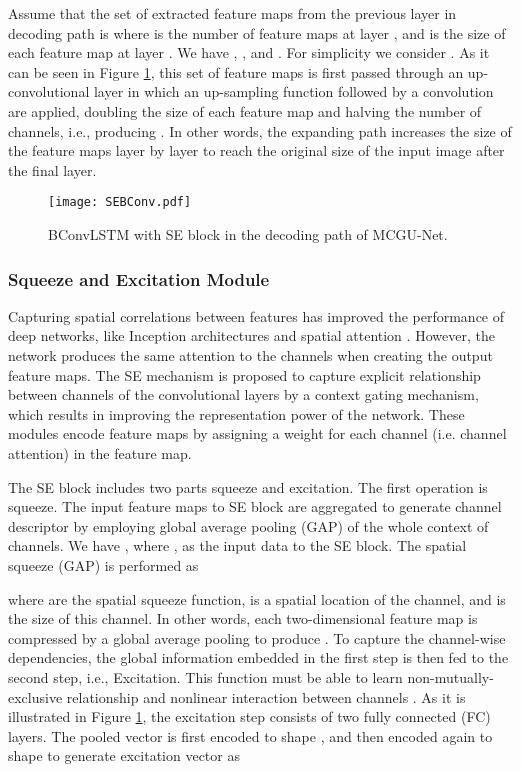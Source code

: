 \documentclass[journal]{IEEEtran}
\begin{document}
Assume that the set of extracted feature maps from the previous layer in decoding path is  where  is the number of feature maps at layer , and  is the size of each feature map at layer . We have , , and . For simplicity we consider . As it can be seen in Figure \ref{fig:BConvLSTM}, this set of feature maps is first passed through an up-convolutional layer in which an up-sampling function followed by a  convolution are applied, doubling the size of each feature map and halving the number of channels, i.e., producing  . In other words, the expanding path increases the size of the feature maps layer by layer to reach the original size of the input image after the final layer.





\begin{figure}
\centering
\texttt{[image: SEBConv.pdf]}
\caption{BConvLSTM with SE block in the decoding path of MCGU-Net.} \label{fig:BConvLSTM}
\vspace*{-\baselineskip}
\end{figure}


\subsubsection{Squeeze and Excitation Module}
Capturing spatial correlations between features has improved the performance of deep networks, like Inception architectures \cite{szegedy2015going} and spatial attention \cite{jaderberg2015spatial}. 
However, the network produces the same attention to the channels when creating the output feature maps.
The SE mechanism \cite{hu2018squeeze} is proposed to capture explicit relationship between channels of the convolutional layers by a context gating mechanism, which results in improving the representation power of the network. These modules encode feature maps by assigning a weight for each channel (i.e. channel attention) in the feature map. 


The SE block includes two parts squeeze and excitation. The first operation is squeeze. The input feature maps to SE block are aggregated to generate channel descriptor by employing global average pooling (GAP) of the whole context of channels. We have  , where , as the input data to the SE block. The spatial squeeze (GAP) is performed as




\noindent where  are the spatial squeeze function,  is a spatial location of the  channel, and  is the size of this channel. In other words, each two-dimensional feature map is compressed by a global average pooling to produce . 
To capture the channel-wise dependencies, the global information embedded in the first step is then fed to the second step, i.e., Excitation. This function must be able to learn non-mutually-exclusive relationship and nonlinear interaction between channels \cite{hu2018squeeze}. As it is illustrated in Figure \ref{fig:BConvLSTM}, the excitation step consists of two fully connected (FC) layers. The pooled vector is first encoded to shape , and then encoded again to shape  to generate excitation vector as 
\end{document}
